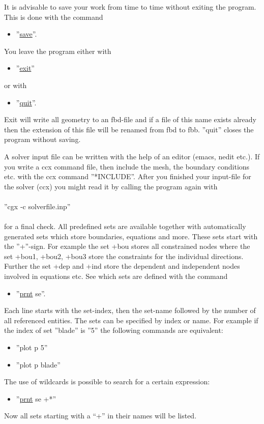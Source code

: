 \documentclass{article}
\providecommand{\htmlref}[2]{\hyperref[#2]{#1}}
\begin{document}
It is advisable to save your work from time to time without exiting the program. This is done with the command
\begin{itemize}
\item ''\htmlref{save}{save}''.
\end{itemize}
You leave the program either with 
\begin{itemize}
\item ''\htmlref{exit}{exit}''
\end{itemize}
or with
\begin{itemize}
\item ''\htmlref{quit}{quit}''.
\end{itemize}
Exit will write all geometry to an fbd-file and if a file of this name exists already then the extension of this file will be renamed from fbd to fbb. ''quit''  closes the program without saving. 

A solver input file can be written with the help of an editor (emacs, nedit etc.). If you write a ccx command file, then include the mesh, the boundary conditions etc. with the ccx command ''*INCLUDE''. After you finished your input-file for the solver (ccx) you might read it by calling the program again with\\\\  ''cgx -c solverfile.inp''\\\\for a final check. All predefined sets are available together with automatically generated sets which store boundaries, equations and more. These sets start with the ''+''-sign. For example the set +bou stores all constrained nodes where the set +bou1, +bou2, +bou3 store the constraints for the individual directions. Further the set +dep and +ind store the dependent and independent nodes involved in equations etc. See which sets are defined with the command
\begin{itemize}
\item ''\htmlref{prnt}{prnt} se''.
\end{itemize}
Each line starts with the set-index, then the set-name followed by the number of all referenced entities. The sets can be specified by index or name. For example if the index of set ''blade'' is ''5'' the following commands are equivalent:
\begin{itemize}
\item ''plot p 5''
\item ''plot p blade''
\end{itemize}
The use of wildcards is possible to search for a certain expression:
\begin{itemize}
\item ''\htmlref{prnt}{prnt} se +*''
\end{itemize}
Now all sets starting with a ``+'' in their names will be listed.
\end{document}
